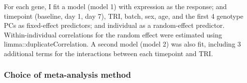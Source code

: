 For each gene, I fit a model (model 1) with expression as the response; and timepoint (baseline, day 1, day 7), \gls{TRI}, batch, sex, age, and the first 4 genotype \glspl{PC} as fixed-effect predictors; and individual as a random-effect predictor.
Within-individual correlations for the random effect were estimated using limma::duplicateCorrelation.
A second model (model 2) was also fit, including 3 additional terms for the interactions between each timepoint and \gls{TRI}.

\subsubsection{Choice of  meta-analysis method}

